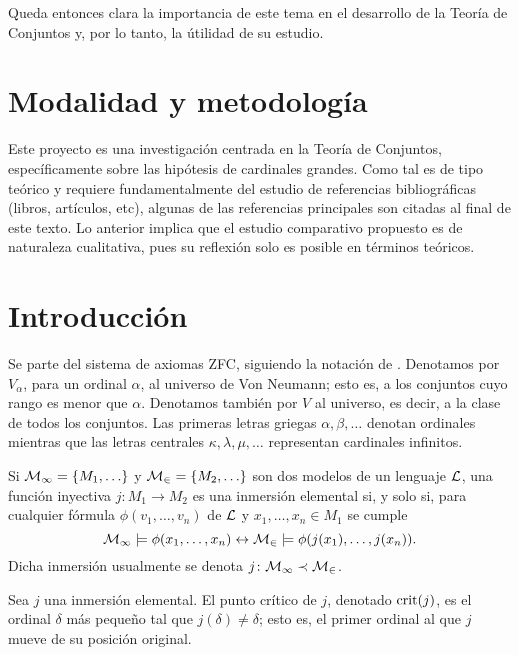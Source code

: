 \documentclass[12pt]{article}
\begin{document}
    Queda entonces clara la importancia de este tema en el desarrollo de la Teoría de Conjuntos y,
    por lo tanto, la útilidad de su estudio.

    \section{Modalidad y metodología}
    Este proyecto es una investigación centrada en la Teoría de Conjuntos,
    específicamente sobre las hipótesis de cardinales grandes.
    Como tal es de tipo teórico y requiere fundamentalmente del estudio
    de referencias bibliográficas (libros, artículos, etc), algunas de las referencias principales son citadas
    al final de este texto.
    Lo anterior implica que el estudio comparativo propuesto es de naturaleza cualitativa,
    pues su reflexión solo es posible en términos teóricos.

    \section{Introducción}
    Se parte del sistema de axiomas ZFC, siguiendo la notación de \cite{kanamori_higher_2009}.
    Denotamos por $V_\alpha$, para un ordinal $\alpha$, al universo de Von Neumann; esto es,
    a los conjuntos cuyo rango es menor que $\alpha$. Denotamos también por $V$ al universo,
    es decir, a la clase de todos los conjuntos.
    Las primeras letras griegas $\alpha,\beta,\dots$ denotan ordinales mientras que las
    letras centrales $\kappa,\lambda,\mu,\dots$ representan cardinales infinitos.

    \begin{defi}
    Si $\model{M_1} = \set{M_1,\dots}$ y $\model{M_2} = \set{M_2,\dots}$ son dos modelos de un
    lenguaje $\mathcal { L }$, una función inyectiva $j\colon M_1\to M_2$ es una inmersión elemental si,
    y solo si, para cualquier fórmula $\phi(v_1,\dots,v_n)$ de $\mathcal { L }$ y $x_1,\dots,x_n\in M_1$ se cumple
    \[
        \mathcal { M_1 }\models \phi(x_1,\dots,x_n) \leftrightarrow \mathcal { M_2 }\models \phi(j(x_1),\dots,j(x_n)).
    \]
    Dicha inmersión usualmente se denota $j\colon \mathcal { M_1 }\prec\mathcal { M_2 }$.
    \end{defi}

    \begin{defi}
    Sea $j$ una inmersión elemental. El punto crítico de $j$, denotado $\mathrm { crit } ( j )$, es el ordinal $\delta$ más pequeño
    tal que $j(\delta)\neq\delta$; esto es, el primer ordinal al que $j$ mueve de su posición original.
    \end{defi}
\end{document}
